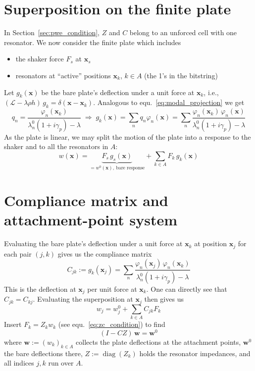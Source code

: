 \section{Superposition on the finite plate}

In Section~\ref{sec:pwe_condition}, $Z$ and $C$ belong to an unforced cell with
one resonator. We now consider the finite plate which includes
\begin{itemize}
  \item the shaker force $F_s$ at $\mathbf{x}_s$
  \item resonators at ``active'' positions $\mathbf{x}_k$, $k \in A$ (the 1's in
        the bitstring)
\end{itemize}
Let $g_k(\mathbf{x})$ be the bare plate's deflection under a unit force at
$\mathbf{x}_k$, i.e., $(\mathcal{L} - \lambda\rho h)\, g_k = \delta(\mathbf{x} - \mathbf{x}_k)$.
Analogous to equ.~\eqref{eq:modal_projection} we get
\begin{equation}
  q_n = \frac{\varphi_n(\mathbf{x}_k)}{\lambda_n^0(1 + i\gamma_p) - \lambda}
  \;\Rightarrow\;
  g_k(\mathbf{x}) = \sum_n q_n \varphi_n(\mathbf{x})
  = \sum_n \frac{\varphi_n(\mathbf{x}_k)\,\varphi_n(\mathbf{x})}{\lambda_n^0(1 + i\gamma_p) - \lambda}
\end{equation}
As the plate is linear, we may split the motion of the plate into a response to
the shaker and to all the resonators in $A$:
\begin{equation}
  \boxed{\;w(\mathbf{x}) = \underbrace{F_s\, g_s(\mathbf{x})}_{= w^0(\mathbf{x}),\ \text{bare response}}
  + \sum_{k \in A} F_k\, g_k(\mathbf{x})\;}
  \label{eq:finite_plate_superposition}
\end{equation}

\section{Compliance matrix and attachment-point system}

Evaluating the bare plate's deflection
under a unit force at $\mathbf{x}_k$ at position $\mathbf{x}_j$ for each pair
$(j, k)$ gives us the compliance matrix
\begin{equation}
  C_{jk} := g_k(\mathbf{x}_j)
  = \sum_n \frac{\varphi_n(\mathbf{x}_j)\,\varphi_n(\mathbf{x}_k)}{\lambda_n^0(1 + i\gamma_p) - \lambda}
\end{equation}
%
This is the deflection at $\mathbf{x}_j$ per unit force
at $\mathbf{x}_k$.
One can directly see that $C_{jk} = C_{kj}$.
Evaluating the superposition at $\mathbf{x}_j$ then gives us
\begin{equation}
  w_j = w_j^0 + \sum_{k \in A} C_{jk} F_k
\end{equation}
Insert $F_k = Z_k w_k$ (see equ.~\eqref{eq:zc_condition}) to find
\begin{equation}
  \boxed{\;(I - CZ)\,\mathbf{w} = \mathbf{w}^0\;}
  \label{eq:attachment_point_system}
\end{equation}
where $\mathbf{w} := (w_k)_{k \in A}$ collects the plate deflections at the
attachment points, $\mathbf{w}^0$ the bare deflections there,
$Z := \operatorname{diag}(Z_k)$ holds the resonator impedances, and all indices
$j, k$ run over $A$.

